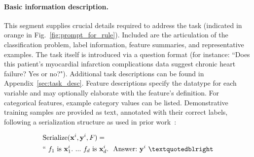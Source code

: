 \paragraph{Basic information description.} This segment supplies crucial details required to address the task (indicated in orange in Fig.~\ref{fig:prompt_for_rule}). Included are the articulation of the classification problem, label information, feature summaries, and representative examples. The task itself is introduced via a question format (for instance: ``Does this patient's myocardial infarction complications data suggest chronic heart failure? Yes or no?"). Additional task descriptions can be found in Appendix~\ref{sec:task_desc}. Feature descriptions specify the datatype for each variable and may optionally elaborate with the feature's definition. For categorical features, example category values can be listed. Demonstrative training samples are provided as text, annotated with their correct labels, following a serialization structure as used in prior work~\cite{dinh2022lift,hegselmann2023tabllm}:

\begin{align}
&\text{Serialize}(\mathbf{x}^i,\mathbf{y}^i, F) = \nonumber \\ 
&``\ f_1\ \text{is}\ \mathbf{x}^i_1.\ ... \ f_d\  \text{is}\  \mathbf{x}^i_d.\ \ \text{Answer:}\  \mathbf{y}^i\ ”
\end{align}

\vspace*{-0.12in}
